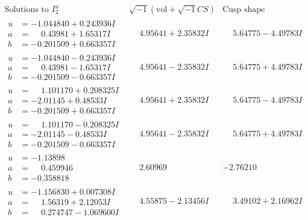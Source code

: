 \documentclass[1p]{elsarticle_modified}
\theoremstyle{definition}
\newcommand{\I}{\sqrt{-1}}
\begin{document}
$$\begin{array}{c|c|c}  
\text{Solutions to }I^u_{2}& \I (\text{vol} + \sqrt{-1}CS) & \text{Cusp shape}\\
 \hline 
\begin{aligned}
u &= -1.044840 + 0.243936 I \\
a &= \phantom{-}0.43981 + 1.65317 I \\
b &= -0.201509 + 0.663357 I\end{aligned}
 & \phantom{-}4.95641 + 2.35832 I & \phantom{-}5.64775 - 4.49783 I \\ \hline\begin{aligned}
u &= -1.044840 - 0.243936 I \\
a &= \phantom{-}0.43981 - 1.65317 I \\
b &= -0.201509 - 0.663357 I\end{aligned}
 & \phantom{-}4.95641 - 2.35832 I & \phantom{-}5.64775 + 4.49783 I \\ \hline\begin{aligned}
u &= \phantom{-}1.101170 + 0.208325 I \\
a &= -2.01145 + 0.48533 I \\
b &= -0.201509 + 0.663357 I\end{aligned}
 & \phantom{-}4.95641 + 2.35832 I & \phantom{-}5.64775 - 4.49783 I \\ \hline\begin{aligned}
u &= \phantom{-}1.101170 - 0.208325 I \\
a &= -2.01145 - 0.48533 I \\
b &= -0.201509 - 0.663357 I\end{aligned}
 & \phantom{-}4.95641 - 2.35832 I & \phantom{-}5.64775 + 4.49783 I \\ \hline\begin{aligned}
u &= -1.13898\phantom{ +0.000000I} \\
a &= \phantom{-}0.459946\phantom{ +0.000000I} \\
b &= -0.358818\phantom{ +0.000000I}\end{aligned}
 & \phantom{-}2.60969\phantom{ +0.000000I} & -2.76210\phantom{ +0.000000I} \\ \hline\begin{aligned}
u &= -1.156830 + 0.007308 I \\
a &= \phantom{-}1.56319 + 2.12053 I \\
b &= \phantom{-}0.274747 - 1.069600 I\end{aligned}
 & \phantom{-}4.55875 - 2.13456 I & \phantom{-}3.49102 + 2.16962 I \\ \hline\begin{aligned}

\end{aligned}
\end{array}$$
\end{document}
